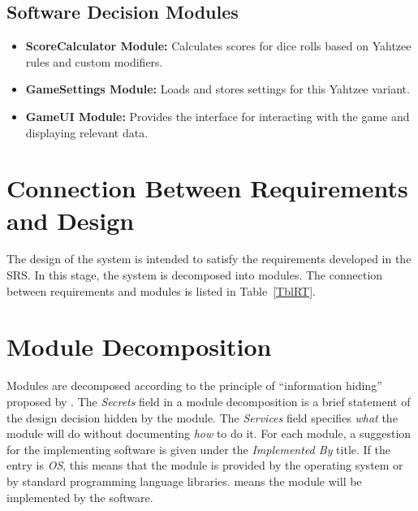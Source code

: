 \documentclass[12pt, titlepage]{article}
\begin{document}
\subsection{Software Decision Modules}
\begin{itemize}
    \item \textbf{ScoreCalculator Module:} Calculates scores for dice rolls based on Yahtzee rules and custom modifiers.
    \item \textbf{GameSettings Module:} Loads and stores settings for this Yahtzee variant.
    \item \textbf{GameUI Module:} Provides the interface for interacting with the game and displaying relevant data.
\end{itemize}

\section{Connection Between Requirements and Design} \label{SecConnection}

The design of the system is intended to satisfy the requirements developed in
the SRS. In this stage, the system is decomposed into modules. The connection
between requirements and modules is listed in Table~\ref{TblRT}.


\section{Module Decomposition} \label{SecMD}

Modules are decomposed according to the principle of ``information hiding''
proposed by \citet{ParnasEtAl1984}. The \emph{Secrets} field in a module
decomposition is a brief statement of the design decision hidden by the
module. The \emph{Services} field specifies \emph{what} the module will do
without documenting \emph{how} to do it. For each module, a suggestion for the
implementing software is given under the \emph{Implemented By} title. If the
entry is \emph{OS}, this means that the module is provided by the operating
system or by standard programming language libraries.  \emph{\progname{}} means the
module will be implemented by the \progname{} software.
\end{document}
